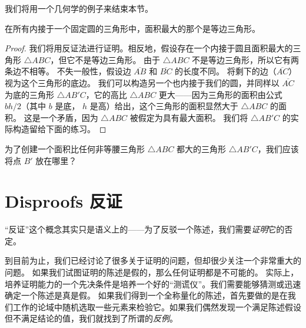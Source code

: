 我们将用一个几何学的例子来结束本节。

\begin{thm}
      在所有内接于一个固定圆的三角形中，面积最大的那个是等边三角形。
\end{thm}

\begin{proof}    
      我们将用反证法进行证明。相反地，假设存在一个内接于圆且面积最大的三角形 $\triangle ABC$，但它不是等边三角形。
      由于 $\triangle ABC$ 不是等边三角形，所以它有两条边不相等。
      不失一般性，假设边 $\overline{AB}$ 和 $\overline{BC}$ 的长度不同。
      将剩下的边（$\overline{AC}$）视为这个三角形的底边。
      我们可以构造另一个也内接于我们的圆，并同样以 $\overline{AC}$ 为底的三角形 $\triangle AB'C$，它的高比 $\triangle ABC$ 更大——因为三角形的面积由公式 $bh/2$（其中 $b$ 是底， $h$ 是高）给出，这个三角形的面积显然大于 $\triangle ABC$ 的面积。
      这是一个矛盾，因为 $\triangle ABC$ 被假定为具有最大面积。
      我们将 $\triangle AB'C$ 的实际构造留给下面的练习。
\end{proof}

\begin{exer}
      为了创建一个面积比任何非等腰三角形 $\triangle ABC$ 都大的三角形 $\triangle AB'C$，我们应该将点 $B'$ 放在哪里？
      \begin{center}
            
      \end{center}

\end{exer}
\clearpage




\newpage


\section{Disproofs 反证}
\label{sec:disproofs}

“反证”这个概念其实只是语义上的——为了反驳一个陈述，我们需要\emph{证明}它的否定。

到目前为止，我们已经讨论了很多关于证明的问题，但却很少关注一个非常重大的问题。
如果我们试图证明的陈述是假的，那么任何证明都是不可能的。
实际上，培养证明能力的一个先决条件是培养一个好的“测谎仪”。我们需要能够猜测或迅速确定一个陈述是真是假。
如果我们得到一个全称量化的陈述，首先要做的是在我们工作的论域中随机选取一些元素来检验它。如果我们偶然发现一个满足陈述假设但不满足结论的值，我们就找到了所谓的\emph{反例}。

